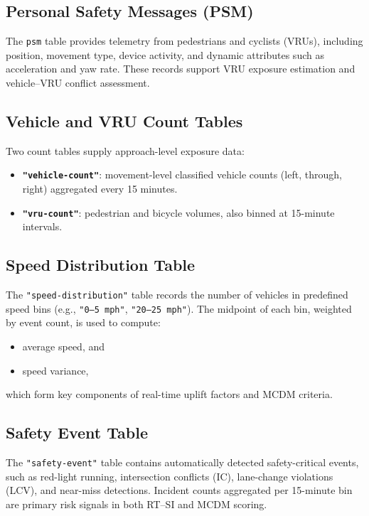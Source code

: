\documentclass[conference]{IEEEtran}
\begin{document}
\subsection{Personal Safety Messages (PSM)}
The \texttt{psm} table provides telemetry from pedestrians and cyclists 
(VRUs), including position, movement type, device activity, and dynamic 
attributes such as acceleration and yaw rate. These records support VRU 
exposure estimation and vehicle--VRU conflict assessment.

\subsection{Vehicle and VRU Count Tables}
Two count tables supply approach-level exposure data:
\begin{itemize}
    \item \textbf{\texttt{"vehicle-count"}}: movement-level classified vehicle counts 
          (left, through, right) aggregated every 15 minutes.
    \item \textbf{\texttt{"vru-count"}}: pedestrian and bicycle volumes, also binned 
          at 15-minute intervals.
\end{itemize}

\subsection{Speed Distribution Table}
The \texttt{"speed-distribution"} table records the number of vehicles in 
predefined speed bins (e.g., \texttt{"0--5 mph"}, \texttt{"20--25 mph"}).  
The midpoint of each bin, weighted by event count, is used to compute:
\begin{itemize}
    \item average speed, and
    \item speed variance,
\end{itemize}
which form key components of real-time uplift factors and MCDM criteria.

\subsection{Safety Event Table}
The \texttt{"safety-event"} table contains automatically detected safety-critical 
events, such as red-light running, intersection conflicts (IC), lane-change 
violations (LCV), and near-miss detections.  
Incident counts aggregated per 15-minute bin are primary risk signals in both 
RT--SI and MCDM scoring.
\end{document}
